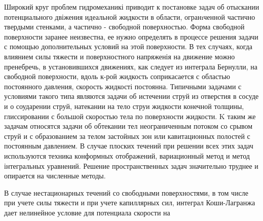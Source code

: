 \documentclass[10pt]{article}
\begin{document}
Широкий круг проблем гидромеханикі приводит к постановке задач об отыскании потенциального двіжения идеальной жидкости в области, огранıченной частично твердыми стенками, а частично - свободной поверхностью. Форма свободной поверхности заранее неизвестна, ее нужно определять в процессе решения задачи с помощью дополнительных условий на этой поверхности. В тех случаях, когда влиянием силы тяжести и поверхностного напряженія на движение можно пренебречь, в установившихся движениях, как следует из интеграла Бернулли, на свободной поверхности, вдоль к-рой жидкость соприкасается с областью постоянного давления, скорость жидкості постоянна. Типичными задачами с условиями такого типа являются задачи об истечении струй из отверстия в сосуде и о соударении струй, натекании на тело струи жидкости конечной толщины, глиссировании с большой скоростью тела по поверхности жидкости. $\mathrm{K}$ таким же задачам относятся задачи об обтекании тел неограниченным потоком со срывом струй и с образованием за телом застойных зон или кавитационных полостей с постоянным давлением. В случае плоских течений при решении всех этих задач используются техника конформных отображений, вариационный метод и метод інтегральных уравнений. Решение пространственных задач значительно труднее и опирается на численные методы.



В случае нестационарных течений со свободными поверхностями, в том числе при учете силы тяжести и при учете капиллярных сил, интеграл Коши-Лагранжа дает нелинейное условие для потенциала скорости на
\end{document}
